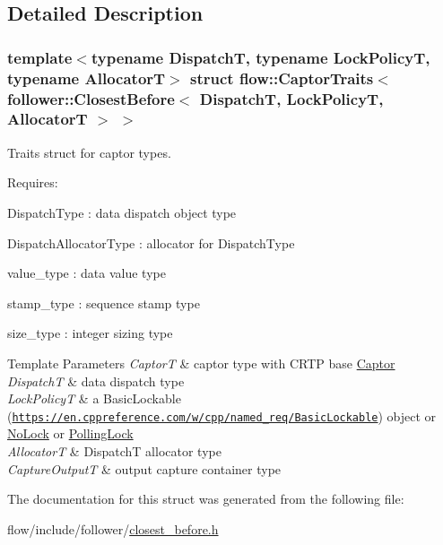 \subsection{Detailed Description}
\subsubsection*{template$<$typename DispatchT, typename Lock\+PolicyT, typename AllocatorT$>$\newline
struct flow\+::\+Captor\+Traits$<$ follower\+::\+Closest\+Before$<$ Dispatch\+T, Lock\+Policy\+T, Allocator\+T $>$ $>$}

Traits struct for captor types. 

Requires\+:
\begin{DoxyItemize}
\item {\ttfamily Dispatch\+Type} \+: data dispatch object type
\item {\ttfamily Dispatch\+Allocator\+Type} \+: allocator for {\ttfamily Dispatch\+Type}
\item {\ttfamily value\+\_\+type} \+: data value type
\item {\ttfamily stamp\+\_\+type} \+: sequence stamp type
\item {\ttfamily size\+\_\+type} \+: integer sizing type
\end{DoxyItemize}


\begin{DoxyTemplParams}{Template Parameters}
{\em CaptorT} & captor type with C\+R\+TP base {\ttfamily \hyperlink{classflow_1_1_captor}{Captor}}\\
\hline
{\em DispatchT} & data dispatch type \\
\hline
{\em Lock\+PolicyT} & a Basic\+Lockable (\href{https://en.cppreference.com/w/cpp/named_req/BasicLockable}{\tt https\+://en.\+cppreference.\+com/w/cpp/named\+\_\+req/\+Basic\+Lockable}) object or \hyperlink{structflow_1_1_no_lock}{No\+Lock} or \hyperlink{structflow_1_1_polling_lock}{Polling\+Lock} \\
\hline
{\em AllocatorT} & {\ttfamily DispatchT} allocator type \\
\hline
{\em Capture\+OutputT} & output capture container type \\
\hline
\end{DoxyTemplParams}


The documentation for this struct was generated from the following file\+:\begin{DoxyCompactItemize}
\item 
flow/include/follower/\hyperlink{closest__before_8h}{closest\+\_\+before.\+h}\end{DoxyCompactItemize}
